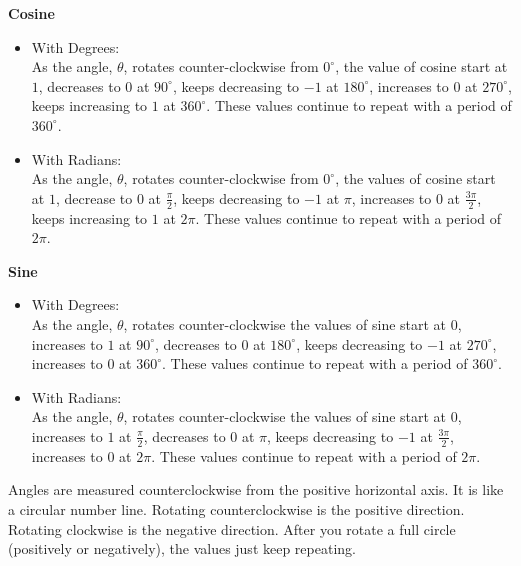 \documentclass{ximera}
\begin{document}
\begin{idea} \textbf{\textcolor{blue!55!black}{Cosine}}
\begin{itemize}
\item With Degrees: \\
As the angle, $\theta$, rotates counter-clockwise from $0^\circ$, the value of cosine start at $1$, decreases to $0$ at $90^\circ$, keeps decreasing to $-1$ at $180^\circ$, increases to $0$ at $270^\circ$, keeps increasing to $1$ at $360^\circ$.  These values continue to repeat with a period of $360^\circ$.

\item With Radians: \\
As the angle, $\theta$, rotates counter-clockwise from $0^\circ$, the values of cosine start at $1$, decrease to $0$ at $\frac{\pi}{2}$, keeps decreasing to $-1$ at $\pi$, increases to $0$ at $\frac{3\pi}{2}$, keeps increasing to $1$ at $2\pi$.  These values continue to repeat with a period of $2\pi$.
\end{itemize}
\end{idea}



\begin{idea} \textbf{\textcolor{blue!55!black}{Sine}}
\begin{itemize}
\item With Degrees: \\
As the angle, $\theta$, rotates counter-clockwise the values of sine start at $0$, increases to $1$ at $90^\circ$, decreases to $0$ at $180^\circ$, keeps decreasing to $-1$ at $270^\circ$, increases to $0$ at $360^\circ$.  These values continue to repeat with a period of $360^\circ$.

\item With Radians: \\
As the angle, $\theta$, rotates counter-clockwise the values of sine start at $0$, increases to $1$ at $\frac{\pi}{2}$, decreases to $0$ at $\pi$, keeps decreasing to $-1$ at $\frac{3\pi}{2}$, increases to $0$ at $2\pi$.  These values continue to repeat with a period of $2\pi$.
\end{itemize}
\end{idea}



Angles are measured counterclockwise from the positive horizontal axis.  It is like a circular number line.  Rotating counterclockwise is the positive direction.  Rotating clockwise is the negative direction.  After you rotate a full circle (positively or negatively), the values just keep repeating.
\end{document}
